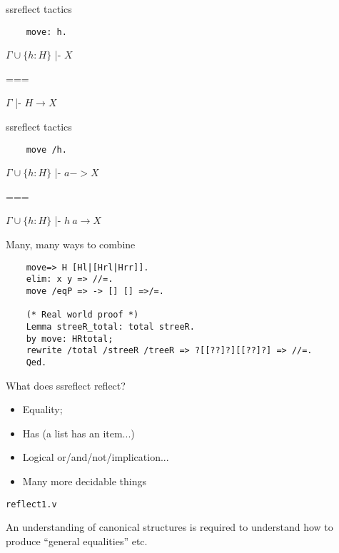 \documentclass{beamer}
\begin{document}
\begin{frame}[fragile]{ssreflect tactics}

    \begin{lstlisting}
    move: h.
    \end{lstlisting}

    $\Gamma \cup \{ h:H \} $ |-  $X $
    
===

$\Gamma $ |- $ H \rightarrow X$ 
\end{frame}

\begin{frame}[fragile]{ssreflect tactics}

    \begin{lstlisting}
    move /h.
    \end{lstlisting}

    $\Gamma \cup \{ h:H \} $ |-  $ a -> X $
    
===

$\Gamma \cup \{ h:H \} $ |- $ h \ a \rightarrow X$ 
\end{frame}

\begin{frame}[fragile]{Many, many ways to combine}
    \begin{lstlisting}
    move=> H [Hl|[Hrl|Hrr]].
    elim: x y => //=.
    move /eqP => -> [] [] =>/=.  

    (* Real world proof *)
    Lemma streeR_total: total streeR. 
    by move: HRtotal;
    rewrite /total /streeR /treeR => ?[[??]?][[??]?] => //=.
    Qed.
    \end{lstlisting}
\end{frame}

\begin{frame}{What does ssreflect reflect?}
    \begin{itemize}
        \item Equality;
        \item Has (a list has an item...)
        \item Logical or/and/not/implication...
        \item Many more decidable things
    \end{itemize}
    
    \texttt{reflect1.v}
\end{frame}

\begin{frame}

    An understanding of canonical structures is required to understand how to
produce ``general equalities'' etc. 

\end{frame}
\end{document}
